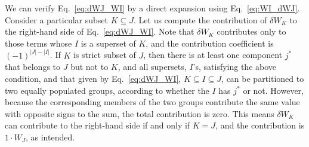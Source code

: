 \documentclass[reprint, superscriptaddress]{revtex4-1}
\begin{document}
We can verify Eq.~\eqref{eq:dWJ_WI}
by a direct expansion using Eq.~\eqref{eq:WI_dWJ}.
%
Consider a particular subset $K \subseteq J$.
Let us compute the contribution of $\delta W_K$
to the right-hand side of Eq.~\eqref{eq:dWJ_WI}.
%
Note that $\delta W_K$ contributes only to those terms
whose $I$ is a superset of $K$,
and the contribution coefficient is $(-1)^{|J|-|I|}$.
%
If $K$ is strict subset of $J$,
then there is at least one component $j^*$ that belongs to $J$
but not to $K$,
and all supersets, $I$'s,
satisfying the above condition, and that given by Eq.~\eqref{eq:dWJ_WI},
$K \subseteq I \subseteq J$,
can be partitioned to two equally populated groups,
according to whether the $I$ has $j^*$ or not.
%
However, because the corresponding members of the two groups
contribute the same value with opposite signs to the sum,
the total contribution is zero.
%
This means $\delta W_K$ can contribute to the right-hand side
if and only if $K = J$, and the contribution is $1 \cdot W_J$,
as intended.



\end{document}
